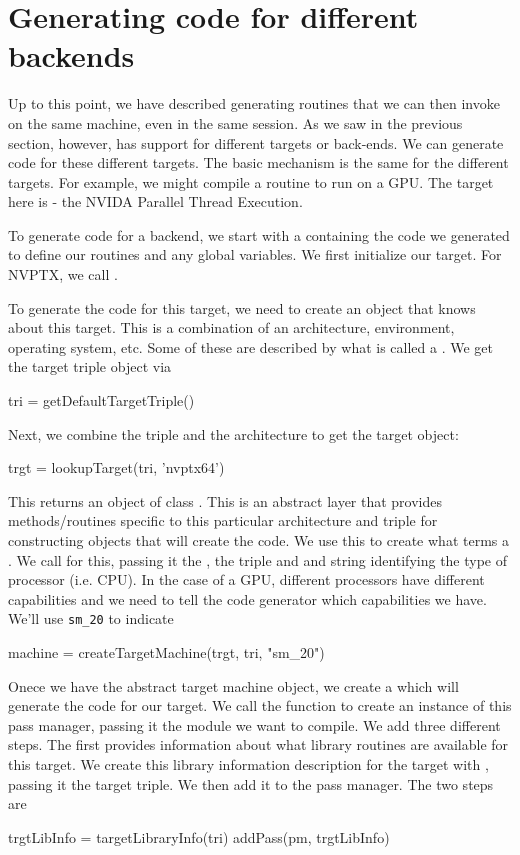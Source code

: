 \documentclass[article]{jss}
\begin{document}




\section{Generating code for different backends}
Up to this point, we have described generating routines
that we can then invoke on the same machine, even in the
same \R{} session.
As we saw in the previous section, however, \llvm{}
has support for different targets or back-ends.
We can generate  code for these different targets.
The basic mechanism is the same for the different targets.
For example, we might compile a routine to run on a GPU.
The target here is  - the NVIDA Parallel Thread Execution.

To generate code for a backend, we start with a  containing the code we generated
to define our routines and any global variables.
We first initialize our target. For NVPTX, we call 
.

To generate the code for this target, we need to create
an object that knows about this target. This is a combination
of an architecture, environment, operating system, etc.
Some of these are described by what is called a .
We get the target triple object via 
\begin{RCode}
tri = getDefaultTargetTriple() 
\end{RCode}
Next, we combine the triple and the architecture to 
get the target object:
\begin{RCode}
trgt = lookupTarget(tri, 'nvptx64')
\end{RCode}
This returns an object of class .  This is an abstract
layer that provides methods/routines specific to this particular
architecture and triple for constructing objects that will create the
code.  We use this to create what \llvm{} terms a
.
We call  for this,
passing it the , the triple and
and string identifying the type of processor (i.e. CPU).
In the case of a GPU, different processors have different
capabilities and we need to tell the code generator 
which capabilities we have. We'll use \texttt{sm_20}
to indicate 
\begin{RCode}
machine = createTargetMachine(trgt, tri, "sm_20") 
\end{RCode}


Onece we have the abstract target machine object, 
we create a  which will generate the
code for our target.
We call the  function to create an instance
of this pass manager, passing it the module we want to compile.
We add three different  steps.
The first provides information about what library routines
are available for this target.
We create this library information description for the target with
, passing it the target triple.
We then add it to the pass manager. The two steps are 
\begin{RCode}
trgtLibInfo = targetLibraryInfo(tri)
addPass(pm, trgtLibInfo)
\end{RCode}
\end{document}
